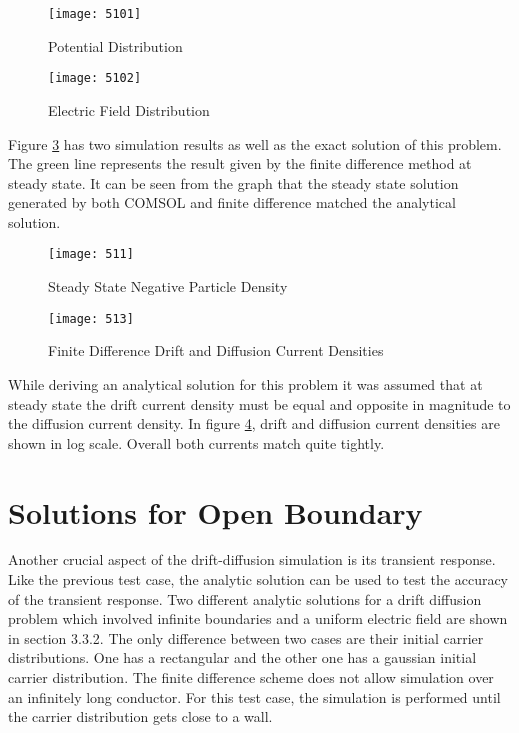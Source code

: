 \begin{doublespace}
\begin{figure}
\centering
\texttt{[image: 5101]}
\caption{Potential Distribution} 
\label{5pot}
\end{figure}

\begin{figure}
\centering
\texttt{[image: 5102]}
\caption{Electric Field Distribution} 
\label{5E}
\end{figure}

\clearpage

Figure  \ref{5ss} has two simulation results as well as the exact solution of this problem. The green line represents the result given by the finite difference method at steady state. It can be seen from the graph that the steady state solution generated by both COMSOL and finite difference matched the analytical solution.

\begin{figure}
\centering
\texttt{[image: 511]}
\caption{Steady State Negative Particle Density} 
\label{5ss}
\end{figure}

\begin{figure}[!htp]
\centering
\texttt{[image: 513]}
\caption{Finite Difference Drift and Diffusion Current Densities}
 \label{5curdens}
\end{figure}

While deriving an analytical solution for this problem it was assumed that at steady state the drift current density must be equal and opposite in magnitude to the diffusion current density. In figure \ref{5curdens}, drift and diffusion current densities are shown in log scale. Overall both currents match quite tightly.

\clearpage
\section{Solutions for Open Boundary}
Another crucial aspect of the drift-diffusion simulation is its transient response. Like the previous test case, the analytic solution can be used to test the accuracy of the transient response. Two different analytic solutions for a  drift diffusion problem which involved infinite boundaries and a uniform electric field are shown in section 3.3.2. The only difference between two cases are their initial carrier distributions. One has a rectangular and the other one has a gaussian initial carrier distribution. The finite difference scheme does not allow simulation over an infinitely long conductor. For this test case, the simulation is performed until the carrier distribution gets close to a wall.   


\end{doublespace}
